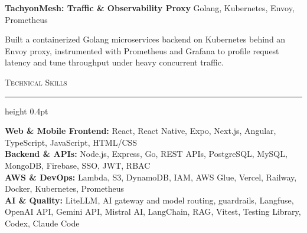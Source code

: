 \documentclass[letterpaper,11pt]{article}
\newcommand{\resumesection}[1]{%
  \par\vspace{2pt}%
  {\large\scshape #1}\par\vspace{2pt}%
  \hrule height 0.4pt\vspace{2pt}%
}
\newcommand{\projectHeading}[2]{
  \textbf{#1} \hfill #2
}
\begin{document}
\projectHeading{TachyonMesh: Traffic \& Observability Proxy}{Golang, Kubernetes, Envoy, Prometheus}
\begin{tightitemize}
  \item Built a containerized Golang microservices backend on Kubernetes behind an Envoy proxy, instrumented with Prometheus and Grafana to profile request latency and tune throughput under heavy concurrent traffic.
\end{tightitemize}

\resumesection{Technical Skills}
\textbf{Web \& Mobile Frontend:} React, React Native, Expo, Next.js, Angular, TypeScript, JavaScript, HTML/CSS\\
\textbf{Backend \& APIs:} Node.js, Express, Go, REST APIs, PostgreSQL, MySQL, MongoDB, Firebase, SSO, JWT, RBAC\\
\textbf{AWS \& DevOps:} Lambda, S3, DynamoDB, IAM, AWS Glue, Vercel, Railway, Docker, Kubernetes, Prometheus\\
\textbf{AI \& Quality:} LiteLLM, AI gateway and model routing, guardrails, Langfuse, OpenAI API, Gemini API, Mistral AI, LangChain, RAG, Vitest, Testing Library, Codex, Claude Code
\end{document}
